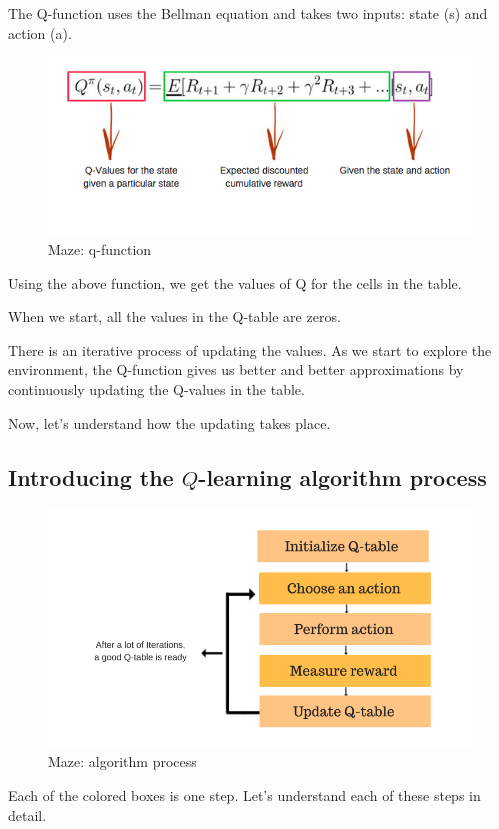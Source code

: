 The Q-function uses the Bellman equation and takes two inputs: state (s) and action (a).

\begin{figure}[H]
\centering
\includegraphics[scale=0.618]{pix/q_learning/q_function.png}
\caption{Maze: q-function}
\end{figure}

Using the above function, we get the values of Q for the cells in the table.

When we start, all the values in the Q-table are zeros.

There is an iterative process of updating the values. As we start to explore the 
environment, the Q-function gives us better and better approximations by continuously 
updating the Q-values in the table.

Now, let's understand how the updating takes place.


\subsection{Introducing the $Q$-learning algorithm process}

\begin{figure}[H]
\centering
\includegraphics[scale=0.4]{pix/q_learning/q_learning_algorithm_process.png}
\caption{Maze: algorithm process}
\end{figure}
Each of the colored boxes is one step. Let's understand each of these steps in detail.


